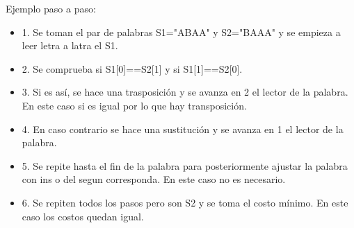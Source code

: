 Ejemplo paso a paso:
\begin{itemize}
\item1.	Se toman el par de palabras S1="ABAA" y S2="BAAA" y se empieza a leer letra a latra el S1.
\item2.	Se comprueba si S1[0]==S2[1] y si S1[1]==S2[0].
\item3. Si es así, se hace una trasposición y se avanza en 2 el lector de la palabra. En este caso si es igual por lo que hay transposición.
\item4. En caso contrario se hace una sustitución y se avanza en 1 el lector de la palabra.
\item5. Se repite hasta el fin de la palabra para posteriormente ajustar la palabra con ins o del segun corresponda. En este caso no es necesario.
\item6. Se repiten todos los pasos pero son S2 y se toma el costo mínimo. En este caso los costos quedan igual.
\end{itemize}